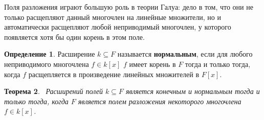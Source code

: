 \documentclass[a4paper,11pt]{scrartcl}
\theoremstyle{plain}
\newtheorem{theorem}{Теорема}[subsection]
\theoremstyle{definition}
\newtheorem{definition}[theorem]{Определение}
\newcommand\dfn[1]{\textbf{#1}}
\newcommand\sseq{\subseteq}
\begin{document}
Поля разложения играют большую роль в теории Галуа: дело в том, что
они не только расщепляют данный многочлен на линейные множители, но и
автоматически расщепляют любой неприводимый многочлен, у которого
появляется хотя бы один корень в этом поле.

\begin{definition}
Расширение $k\sseq F$ называется \dfn{нормальным}, если для любого
неприводимого многочлена $f\in k[x]$ $f$ имеет корень в $F$ тогда и
только тогда, когда $f$ расщепляется в произведение линейных
множителей в $F[x]$.
\end{definition}

\begin{theorem}~\label{thm_normal_is_splitting_field}
Расширений полей $k\sseq F$ является конечным и нормальным тогда и
только тогда, когда $F$ является полем разложения некоторого
многочлена $f\in k[x]$.
\end{theorem}
\end{document}
